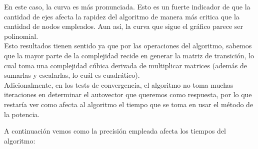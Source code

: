 \begin{center}
\end{center}

En este caso, la curva es más pronunciada. Esto es un fuerte indicador de que la cantidad de ejes afecta la rapidez del algoritmo de manera más critica que la cantidad de nodos empleados. Aun así, la curva que sigue el gráfico parece ser polinomial.\\

Esto resultados tienen sentido ya que por las operaciones del algoritmo, sabemos que la mayor parte de la complejidad recide en generar la matriz de transición, lo cual toma una complejidad cúbica derivada de multiplicar matrices (además de sumarlas y escalarlas, lo cuál es cuadrático). \\
Adicionalmente, en los tests de convergencia, el algoritmo no toma muchas iteraciones en determinar el autovector que queremos como respuesta, por lo que restaría ver como afecta al algoritmo el tiempo que se toma en usar el método de la potencia.

A continuación vemos como la precisión empleada afecta los tiempos del algoritmo:

\begin{center}
\end{center}

